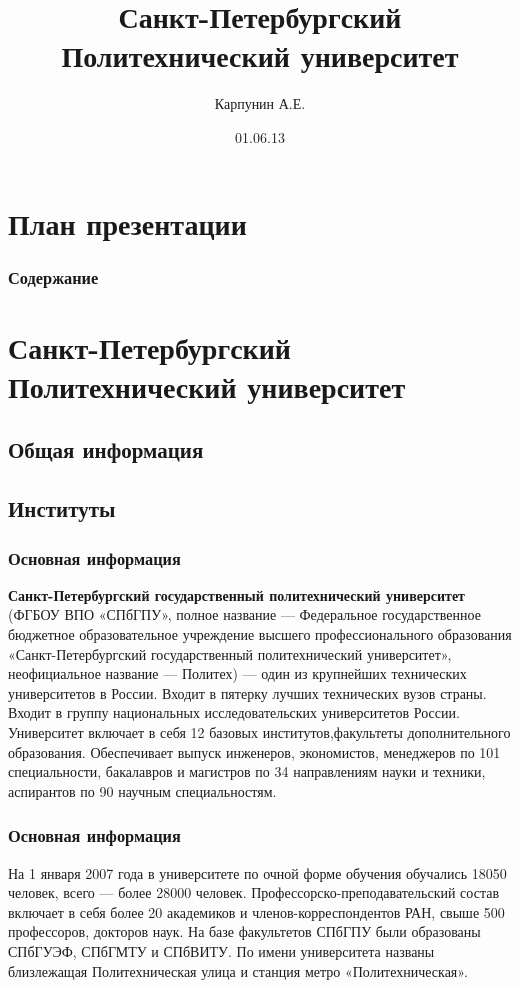 \documentclass[fullscreen=true, bookmarks=false]{beamer}
\title{Санкт-Петербургский Политехнический университет}
\author{Карпунин А.Е.}
\institute{Санкт-Петербургский Политехнический университет}
\date{01.06.13}
\begin{document}
\graphicspath{{noiseimages/}}

\begin{frame}
\transdissolve[duration=0.2]
\titlepage
\end{frame}

\section*{План презентации}


\begin{frame}
\transdissolve[duration=0.1]
\frametitle{Содержание}
\tableofcontents[pausesections]
\end{frame}

\section{Санкт-Петербургский Политехнический университет}
\subsection{Общая информация}
\subsection{Институты}

\begin{frame}
\frametitle{Основная информация}
\textbf{Санкт-Петербургский государственный политехнический университет} (ФГБОУ ВПО «СПбГПУ», полное название — Федеральное государственное бюджетное образовательное учреждение высшего профессионального образования «Санкт-Петербургский государственный политехнический университет», неофициальное название — Политех) — один из крупнейших технических университетов в России. Входит в пятерку лучших технических вузов страны. Входит в группу национальных исследовательских университетов России. Университет включает в себя 12 базовых институтов,факультеты дополнительного образования. Обеспечивает выпуск инженеров, экономистов, менеджеров по 101 специальности, бакалавров и магистров по 34 направлениям науки и техники, аспирантов по 90 научным специальностям.\\

\end{frame}

\begin{frame}
\frametitle{Основная информация}
На 1 января 2007 года в университете по очной форме обучения обучались 18050 человек, всего — более 28000 человек. Профессорско-преподавательский состав включает в себя более 20 академиков и членов-корреспондентов РАН, свыше 500 профессоров, докторов наук.
На базе факультетов СПбГПУ были образованы СПбГУЭФ, СПбГМТУ и СПбВИТУ.
По имени университета названы близлежащая Политехническая улица и станция метро «Политехническая».
\end{frame}
\end{document}
